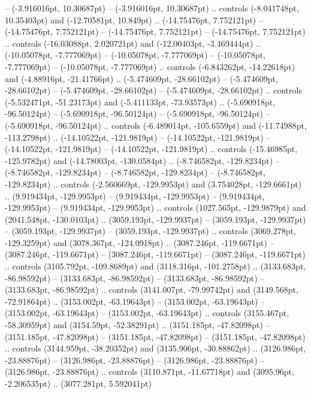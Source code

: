  -- (-3.916016pt, 10.30687pt)
 -- (-3.916016pt, 10.30687pt) .. controls (-8.041748pt, 10.35403pt) and (-12.70581pt, 10.849pt) .. (-14.75476pt, 7.752121pt)
 -- (-14.75476pt, 7.752121pt)
 -- (-14.75476pt, 7.752121pt)
 -- (-14.75476pt, 7.752121pt) .. controls (-16.03088pt, 2.020721pt) and (-12.00403pt, -3.469444pt) .. (-10.05078pt, -7.777069pt)
 -- (-10.05078pt, -7.777069pt)
 -- (-10.05078pt, -7.777069pt)
 -- (-10.05078pt, -7.777069pt) .. controls (-6.843262pt, -14.22618pt) and (-4.88916pt, -21.41766pt) .. (-5.474609pt, -28.66102pt)
 -- (-5.474609pt, -28.66102pt)
 -- (-5.474609pt, -28.66102pt)
 -- (-5.474609pt, -28.66102pt) .. controls (-5.532471pt, -51.23173pt) and (-5.411133pt, -73.93573pt) .. (-5.690918pt, -96.50124pt)
 -- (-5.690918pt, -96.50124pt)
 -- (-5.690918pt, -96.50124pt)
 -- (-5.690918pt, -96.50124pt) .. controls (-6.489014pt, -105.6559pt) and (-11.74988pt, -113.2798pt) .. (-14.10522pt, -121.9819pt)
 -- (-14.10522pt, -121.9819pt)
 -- (-14.10522pt, -121.9819pt)
 -- (-14.10522pt, -121.9819pt) .. controls (-15.46985pt, -125.9782pt) and (-14.78003pt, -130.0584pt) .. (-8.746582pt, -129.8234pt)
 -- (-8.746582pt, -129.8234pt)
 -- (-8.746582pt, -129.8234pt)
 -- (-8.746582pt, -129.8234pt) .. controls (-2.560669pt, -129.9953pt) and (3.754028pt, -129.6661pt) .. (9.919434pt, -129.9953pt)
 -- (9.919434pt, -129.9953pt)
 -- (9.919434pt, -129.9953pt)
 -- (9.919434pt, -129.9953pt) .. controls (1027.565pt, -129.9879pt) and (2041.548pt, -130.0103pt) .. (3059.193pt, -129.9937pt)
 -- (3059.193pt, -129.9937pt)
 -- (3059.193pt, -129.9937pt)
 -- (3059.193pt, -129.9937pt) .. controls (3069.278pt, -129.3259pt) and (3078.367pt, -124.0918pt) .. (3087.246pt, -119.6671pt)
 -- (3087.246pt, -119.6671pt)
 -- (3087.246pt, -119.6671pt)
 -- (3087.246pt, -119.6671pt) .. controls (3105.792pt, -109.8689pt) and (3118.316pt, -101.2758pt) .. (3133.683pt, -86.98592pt)
 -- (3133.683pt, -86.98592pt)
 -- (3133.683pt, -86.98592pt)
 -- (3133.683pt, -86.98592pt) .. controls (3141.007pt, -79.99742pt) and (3149.568pt, -72.91864pt) .. (3153.002pt, -63.19643pt)
 -- (3153.002pt, -63.19643pt)
 -- (3153.002pt, -63.19643pt)
 -- (3153.002pt, -63.19643pt) .. controls (3155.467pt, -58.30959pt) and (3154.59pt, -52.38291pt) .. (3151.185pt, -47.82098pt)
 -- (3151.185pt, -47.82098pt)
 -- (3151.185pt, -47.82098pt)
 -- (3151.185pt, -47.82098pt) .. controls (3144.959pt, -38.20352pt) and (3135.906pt, -30.88862pt) .. (3126.986pt, -23.88876pt)
 -- (3126.986pt, -23.88876pt)
 -- (3126.986pt, -23.88876pt)
 -- (3126.986pt, -23.88876pt) .. controls (3110.871pt, -11.67718pt) and (3095.96pt, -2.206535pt) .. (3077.281pt, 5.592041pt)
